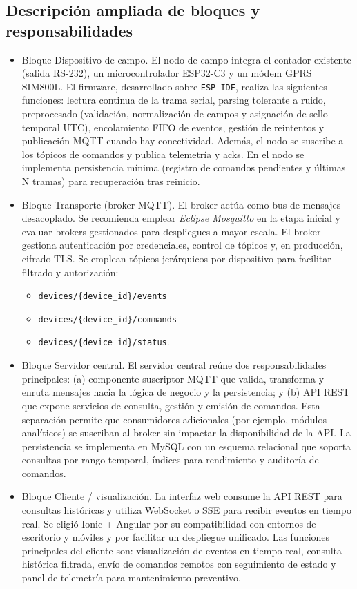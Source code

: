 \subsection{Descripción ampliada de bloques y responsabilidades}
\begin{itemize}

  \item {Bloque  Dispositivo de campo.}
El nodo de campo integra el contador existente (salida RS-232), un microcontrolador ESP32-C3 y un módem GPRS SIM800L. El firmware, desarrollado sobre \texttt{ESP-IDF}, realiza las siguientes funciones: lectura continua de la trama serial, parsing tolerante a ruido, preprocesado (validación, normalización de campos y asignación de sello temporal UTC), encolamiento FIFO de eventos, gestión de reintentos y publicación MQTT cuando hay conectividad. Además, el nodo se suscribe a los tópicos de comandos y publica telemetría y acks. En el nodo se implementa persistencia mínima (registro de comandos pendientes y últimas N tramas) para recuperación tras reinicio.

  \item {Bloque Transporte (broker MQTT).}
El broker actúa como bus de mensajes desacoplado. Se recomienda emplear \textit{Eclipse Mosquitto} en la etapa inicial y evaluar brokers gestionados para despliegues a mayor escala. El broker gestiona autenticación por credenciales, control de tópicos y, en producción, cifrado TLS. Se emplean tópicos jerárquicos por dispositivo para facilitar filtrado y autorización: 
\begin{itemize}
  \item \texttt{devices/\{device\_id\}/events}
  \item \texttt{devices/\{device\_id\}/commands} 
   \item \texttt{devices/\{device\_id\}/status}.
\end{itemize}


  \item {Bloque Servidor central.}
El servidor central reúne dos responsabilidades principales: (a) componente suscriptor MQTT que valida, transforma y enruta mensajes hacia la lógica de negocio y la persistencia; y (b) API REST que expone servicios de consulta, gestión y emisión de comandos. Esta separación permite que consumidores adicionales (por ejemplo, módulos analíticos) se suscriban al broker sin impactar la disponibilidad de la API. La persistencia se implementa en MySQL con un esquema relacional que soporta consultas por rango temporal, índices para rendimiento y auditoría de comandos.

  \item {Bloque Cliente / visualización.}
La interfaz web consume la API REST para consultas históricas y utiliza WebSocket o SSE para recibir eventos en tiempo real. Se eligió Ionic + Angular por su compatibilidad con entornos de escritorio y móviles y por facilitar un despliegue unificado. Las funciones principales del cliente son: visualización de eventos en tiempo real, consulta histórica filtrada, envío de comandos remotos con seguimiento de estado y panel de telemetría para mantenimiento preventivo.
\end{itemize}



